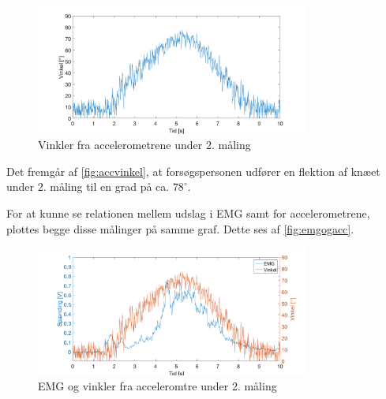 \begin{figure}[H]
	\centering
	\includegraphics[width=0.8\textwidth]{figures/Pilotforsoeg/accvinkel}
	\caption{Vinkler fra accelerometrene under 2. måling}
	\label{fig:accvinkel}
\end{figure}
Det fremgår af \autoref{fig:accvinkel}, at forsøgspersonen udfører en flektion af knæet under 2. måling til en grad på ca. $78^{\circ}$. 

For at kunne se relationen mellem udslag i EMG samt for accelerometrene, plottes begge disse målinger på samme graf. Dette ses af \autoref{fig:emgogacc}. 
\begin{figure}[H]
	\centering
	\includegraphics[width=0.8\textwidth]{figures/Pilotforsoeg/emg_vinkler_tid}
	\caption{EMG og vinkler fra acceleromtre under 2. måling}
	\label{fig:emgogacc}
\end{figure}




%
%
% 
